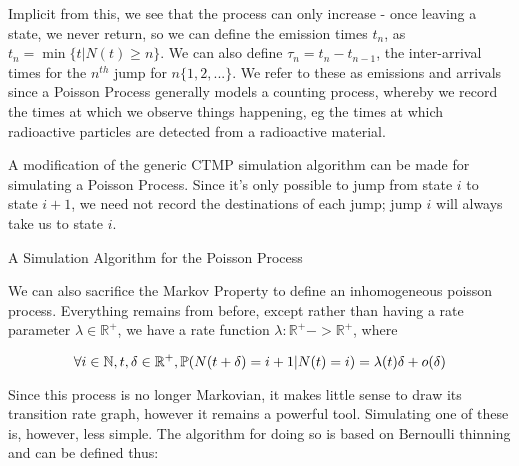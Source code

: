 Implicit from this, we see that the process can only increase - once leaving a state, we never return, so we can define the emission times $t_n$, as $t_n = \min\{t | N(t)\geqslant n\}$. We can also define $\tau_n = t_n-t_{n-1}$, the inter-arrival times for the $n^{th}$ jump for $n \{1,2,...\}$. We refer to these as emissions and arrivals since a Poisson Process generally models a counting process, whereby we record the times at which we observe things happening, eg the times at which radioactive particles are detected from a radioactive material.

A modification of the generic CTMP simulation algorithm can be made for simulating  a Poisson Process. Since it's only possible to jump from state $i$ to state $i+1$, we need not record the destinations of each jump; jump $i$ will always take us to state $i$.

\begin{algorithm}
\SetAlgoLined
{}

\caption{A Simulation Algorithm for the Poisson Process}

\end{algorithm}

We can also sacrifice the Markov Property to define an inhomogeneous poisson process. Everything remains from before, except rather than having a rate parameter $\lambda \in \mathbb{R}^{+}$, we have a rate function $\lambda : \mathbb{R}^{+} -> \mathbb{R}^{+}$, where

$$
\forall i \in \mathbb{N}, t,\delta \in \mathbb{R}^{+}, \mathbb{P} (N(t+\delta) = i+1 | N(t) = i) = \lambda(t) \delta + o(\delta)
$$

Since this process is no longer Markovian, it makes little sense to draw its transition rate graph, however it remains a powerful tool. Simulating one of these is, however, less simple. The algorithm for doing so is based on Bernoulli thinning %
and can be defined thus:

